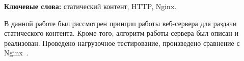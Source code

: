 \begin{essay}{}

\textbf{Ключевые слова:} статический контент, HTTP, Nginx.

В данной работе был рассмотрен принцип работы веб-сервера для раздачи статического контента. Кроме того, алгоритм работы сервера был описан и реализован. Проведено нагрузочное тестирование, произведено сравнение с Nginx~\cite{dejonghe2020nginx}.
\end{essay}